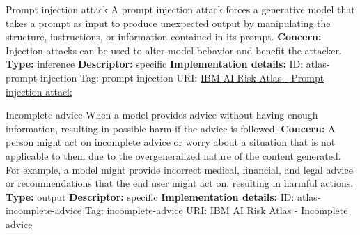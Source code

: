 \documentclass[a4paper,12pt]{article}
\begin{document}
\begin{definitionbox}{Prompt injection attack}
A prompt injection attack forces a generative model that takes a prompt as input to produce unexpected output by manipulating the structure, instructions, or information contained in its prompt.\newline\newline
\textbf{Concern: }Injection attacks can be used to alter model behavior and benefit the attacker.\newline\newline
\textbf{Type: }inference\newline
\textbf{Descriptor: }specific \newline\newline
\textbf{Implementation details: } \newline
ID: atlas-prompt-injection \newline
Tag: prompt-injection \newline
URI:  \href{https://www.ibm.com/docs/en/watsonx/saas?topic=SSYOK8/wsj/ai-risk-atlas/prompt-injection.html}{IBM AI Risk Atlas - Prompt injection attack}\newline
\end{definitionbox}
\begin{definitionbox}{Incomplete advice}
When a model provides advice without having enough information, resulting in possible harm if the advice is followed.\newline\newline
\textbf{Concern: }A person might act on incomplete advice or worry about a situation that is not applicable to them due to the overgeneralized nature of the content generated. For example, a model might provide incorrect medical, financial, and legal advice or recommendations that the end user might act on, resulting in harmful actions.\newline\newline
\textbf{Type: }output\newline
\textbf{Descriptor: }specific \newline\newline
\textbf{Implementation details: } \newline
ID: atlas-incomplete-advice \newline
Tag: incomplete-advice \newline
URI:  \href{https://www.ibm.com/docs/en/watsonx/saas?topic=SSYOK8/wsj/ai-risk-atlas/incomplete-advice.html}{IBM AI Risk Atlas - Incomplete advice}\newline
\end{definitionbox}
\end{document}

